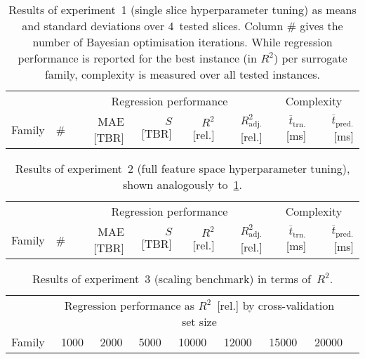 \begin{table}[!hbt]
	\centering
	{\scriptsize
		\begin{tabular}{lrrrrrrr}
		\toprule
		{} & {} & \multicolumn{4}{c}{Regression performance} &
		\multicolumn{2}{c}{Complexity}\\
		\cmidrule(lr){3-6}
		\cmidrule(lr){7-8}
		Family & \# & MAE [TBR] & $S$ [TBR] & $R^2$ [rel.] & $R^2_{\text{adj.}}$ [rel.]
						& $\overline{t}_{\text{trn.}}$ [\si{\milli\second}] &
						$\overline{t}_{\text{pred.}}$ [\si{\milli\second}]\\
		\midrule
		
		\bottomrule
		\end{tabular}
	}
	\caption{Results of experiment~1 (single slice hyperparameter tuning) as
		means and standard deviations over 4~tested slices. Column \# gives the number of Bayesian
		optimisation iterations. While regression performance is reported for the
		best instance (in $R^2$) per surrogate family, complexity is measured over all tested instances.}
	\label{tbl:exp1-detailed-results}
\end{table}

\begin{table}[!hbt]
	\centering
	{\scriptsize
		\begin{tabular}{lrrrrrrr}
		\toprule
		{} & {} & \multicolumn{4}{c}{Regression performance} &
		\multicolumn{2}{c}{Complexity}\\
		\cmidrule(lr){3-6}
		\cmidrule(lr){7-8}
		Family & \# & MAE [TBR] & $S$ [TBR] & $R^2$ [rel.] & $R^2_{\text{adj.}}$ [rel.]
						& $\overline{t}_{\text{trn.}}$ [\si{\milli\second}] &
						$\overline{t}_{\text{pred.}}$ [\si{\milli\second}]\\
		\midrule
		
		\bottomrule
		\end{tabular}
	}
	\caption{Results of experiment~2 (full feature space hyperparameter tuning),
		shown analogously to~\cref{tbl:exp1-detailed-results}.}
	\label{tbl:exp2-detailed-results}
\end{table}

\begin{table}[!hbt]
	\centering
	\setlength\tabcolsep{5pt}
	{\scriptsize
		\begin{tabular}{lrrrrrrrr}
		\toprule
		{} & \multicolumn{7}{c}{Regression performance as $R^2$~[rel.] by cross-validation set size}\\
		\cmidrule(lr){2-8}
		Family
						& \num{1000}
						& \num{2000}
						& \num{5000}
						& \num{10000}
						& \num{12000}
						& \num{15000}
						& \num{20000}\\
		\midrule
		
		\bottomrule
		\end{tabular}
	}
	\caption{Results of experiment~3 (scaling benchmark) in ter\si{\milli\second} of~$R^2$.}
	\label{tbl:exp3-detailed-results-r2}
\end{table}

